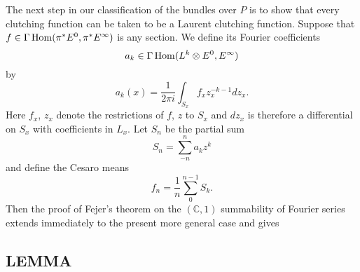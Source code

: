 The next step in our classification of the bundles over $P$ is to show that every clutching function can be taken to be a Laurent clutching function. Suppose that $f \in \Gamma\operatorname{Hom}(\pi^* E^0, \pi^* E^\infty)$ is any section. We define its Fourier coefficients
\begin{equation*}
    a_k \in \Gamma\operatorname{Hom}(L^k \otimes E^0, E^\infty)
\end{equation*}
by
\begin{equation*}
    a_k(x) = \frac{1}{2 \pi i} \int_{S_x} f_x z_x^{-k-1} dz_x .
\end{equation*}
Here $f_x$, $z_x$ denote the restrictions of $f$, $z$ to $S_x$ and $dz_x$ is therefore a differential on $S_x$ with coefficients in $L_x$. Let $S_n$ be the partial sum
\begin{equation*}
    S_n = \sum_{-n}^n a_k z^k
\end{equation*}
and define the Cesaro means
\begin{equation*}
    f_n = \frac{1}{n} \sum_0^{n-1} S_k .
\end{equation*}
Then the proof of Fejer's theorem on the $(\mathbb{C}, 1)$ summability of Fourier series extends immediately to the present more general case and gives

\subsection{LEMMA}\label{2.2.4}
